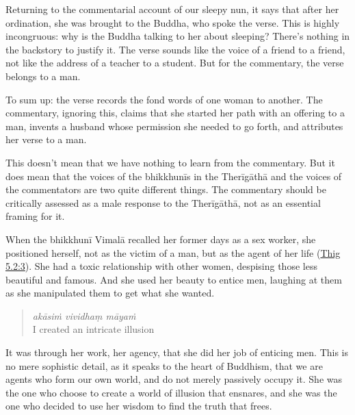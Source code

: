 \documentclass[12pt,openany]{book}%
\begin{document}
Returning to the commentarial account of our sleepy nun, it says that after her ordination, she was brought to the Buddha, who spoke the verse. This is highly incongruous: why is the Buddha talking to her about sleeping? There’s nothing in the backstory to justify it. The verse sounds like the voice of a friend to a friend, not like the address of a teacher to a student. But for the commentary, the verse belongs to a man.

To sum up: the verse records the fond words of one woman to another. The commentary, ignoring this, claims that she started her path with an offering to a man, invents a husband whose permission she needed to go forth, and attributes her verse to a man.

This doesn’t mean that we have nothing to learn from the commentary. But it does mean that the voices of the \textsanskrit{bhikkhunīs} in the \textsanskrit{Therīgāthā} and the voices of the commentators are two quite different things. The commentary should be critically assessed as a male response to the \textsanskrit{Therīgāthā}, not as an essential framing for it.

When the \textsanskrit{bhikkhunī} \textsanskrit{Vimalā} recalled her former days as a sex worker, she positioned herself, not as the victim of a man, but as the agent of her life (\href{https://suttacentral.net/thig5.2/en/sujato\#3.1}{Thig 5.2:3}). She had a toxic relationship with other women, despising those less beautiful and famous. And she used her beauty to entice men, laughing at them as she manipulated them to get what she wanted.

\begin{verse}%
\textit{\textsanskrit{akāsiṁ} vividhaṃ \textsanskrit{māyaṁ}} \\
I created an intricate illusion

%
\end{verse}

It was through her work, her agency, that she did her job of enticing men. This is no mere sophistic detail, as it speaks to the heart of Buddhism, that we are agents who form our own world, and do not merely passively occupy it. She was the one who choose to create a world of illusion that ensnares, and she was the one who decided to use her wisdom to find the truth that frees.
\end{document}
